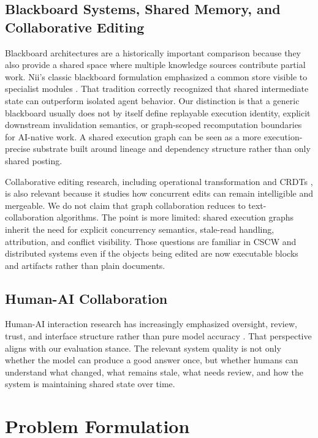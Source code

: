 \documentclass{article}
\begin{document}
\subsection{Blackboard Systems, Shared Memory, and Collaborative Editing}

Blackboard architectures are a historically important comparison because they also provide a shared space where multiple knowledge sources contribute partial work. Nii's classic blackboard formulation emphasized a common store visible to specialist modules \cite{nii1986blackboard}. That tradition correctly recognized that shared intermediate state can outperform isolated agent behavior. Our distinction is that a generic blackboard usually does not by itself define replayable execution identity, explicit downstream invalidation semantics, or graph-scoped recomputation boundaries for AI-native work. A shared execution graph can be seen as a more execution-precise substrate built around lineage and dependency structure rather than only shared posting.

Collaborative editing research, including operational transformation and CRDTs \cite{ellis1989groupware,shapiro2011crdt}, is also relevant because it studies how concurrent edits can remain intelligible and mergeable. We do not claim that graph collaboration reduces to text-collaboration algorithms. The point is more limited: shared execution graphs inherit the need for explicit concurrency semantics, stale-read handling, attribution, and conflict visibility. Those questions are familiar in CSCW and distributed systems even if the objects being edited are now executable blocks and artifacts rather than plain documents.

\subsection{Human-AI Collaboration}

Human-AI interaction research has increasingly emphasized oversight, review, trust, and interface structure rather than pure model accuracy \cite{amershi2019guidelines}. That perspective aligns with our evaluation stance. The relevant system quality is not only whether the model can produce a good answer once, but whether humans can understand what changed, what remains stale, what needs review, and how the system is maintaining shared state over time.

\section{Problem Formulation}
\end{document}
